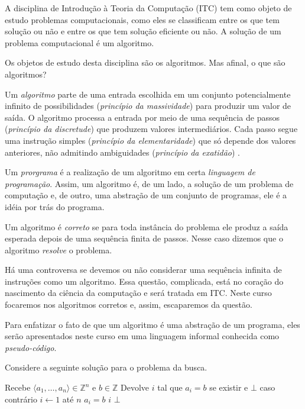 A disciplina de Introdução à Teoria da Computação (ITC) tem como objeto de estudo problemas computacionais, como eles se classificam entre os que tem solução ou não e entre os que tem solução eficiente ou não.
A solução de um problema computacional é um algoritmo.

Os objetos de estudo desta disciplina são os algoritmos.
Mas afinal, o que são algoritmos?

Um {\em algoritmo} parte de uma entrada escolhida em um conjunto potencialmente infinito de possibilidades ({\em princípio da massividade}) para produzir um valor de saída.
O algoritmo processa a entrada por meio de uma sequência de passos ({\em princípio da discretude}) que produzem valores intermediários.
Cada passo  segue uma instrução simples ({\em princípio da elementaridade}) que só depende dos valores anteriores, não admitindo ambiguidades ({\em princípio da exatidão}) \cite{malcev70}.

Um {\em prorgrama} é a realização de um algoritmo em certa {\em linguagem de programação}.
Assim, um algoritmo é, de um lado, a solução de um problema de computação e, de outro, uma abstração de um conjunto de programas, ele é a idéia por trás do programa.

Um algoritmo é {\em correto} se para toda instância do problema ele produz a saída esperada depois de uma sequência finita de passos.
Nesse caso dizemos que o algoritmo {\em resolve} o problema.

Há uma controversa se devemos ou não considerar uma sequência infinita de instruções como um algoritmo.
Essa questão, complicada, está no coração do nascimento da ciência da computação e será tratada em ITC.
Neste curso focaremos nos algoritmos corretos e, assim, escaparemos da questão.

Para enfatizar o fato de que um algoritmo é uma abstração de um programa, eles serão apresentados neste curso em uma linguagem informal conhecida como {\em pseudo-código}.

\begin{example}
  Considere a seguinte solução para o problema da busca.

\begin{codebox}
\li \Comment Recebe $\langle a_1, \dots, a_n \rangle \in \mathbb{Z}^n$ e $b \in \mathbb{Z}$
\li \Comment Devolve $i$ tal que $a_i = b$ se existir e $\bot$ caso contrário
\li \For $i \gets 1$ até $n$
\li \Do \If $a_i = b$
\li     \Then \Return $i$
        \End
    \End
\li \Return $\bot$
\End
\end{codebox}
  
\end{example}


